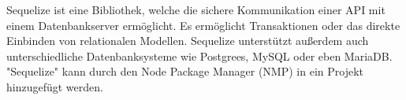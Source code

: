 
Sequelize ist eine Bibliothek, welche die sichere Kommunikation einer API mit einem Datenbankserver ermöglicht. Es ermöglicht Transaktionen oder das direkte Einbinden von relationalen Modellen. Sequelize unterstützt außerdem auch unterschiedliche Datenbanksysteme wie Postgrees, MySQL oder eben MariaDB. "Sequelize" kann durch den Node Package Manager (NMP) in ein Projekt hinzugefügt werden. \cite{Sequelize} \cite{SequInstall}